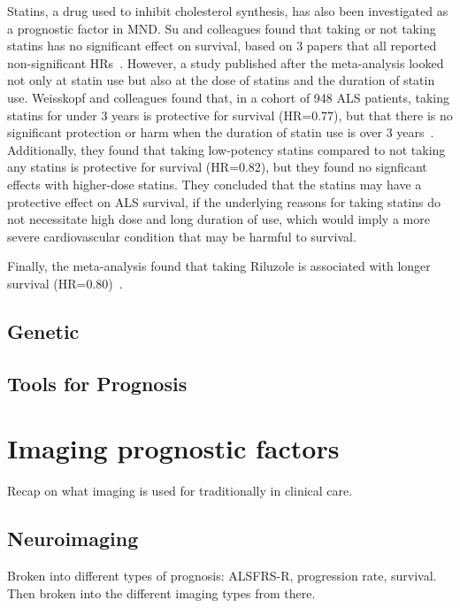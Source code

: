 Statins, a drug used to inhibit cholesterol synthesis, has also been investigated as a prognostic factor in MND.
Su and colleagues found that taking or not taking statins has no significant effect on survival, based on 3 papers that all reported non-significant HRs~\cite{suPredictorsSurvivalPatients2021}.
However, a study published after the meta-analysis looked not only at statin use but also at the dose of statins and the duration of statin use.
Weisskopf and colleagues found that, in a cohort of 948 ALS patients, taking statins for under 3 years is protective for survival (HR=0.77), but that there is no significant protection or harm when the duration of statin use is over 3 years~\cite{weisskopfStatinMedicationsAmyotrophic2022}.
Additionally, they found that taking low-potency statins compared to not taking any statins is protective for survival (HR=0.82), but they found no signficant effects with higher-dose statins.
They concluded that the statins may have a protective effect on ALS survival, if the underlying reasons for taking statins do not necessitate high dose and long duration of use, which would imply a more severe cardiovascular condition that may be harmful to survival.

Finally, the meta-analysis found that taking Riluzole is associated with longer survival (HR=0.80)~\cite{suPredictorsSurvivalPatients2021}.

\subsection{Genetic}

\subsection{Tools for Prognosis}

\section{Imaging prognostic factors}

Recap on what imaging is used for traditionally in clinical care.

\subsection{Neuroimaging}

Broken into different types of prognosis: ALSFRS-R, progression rate, survival.
Then broken into the different imaging types from there.

